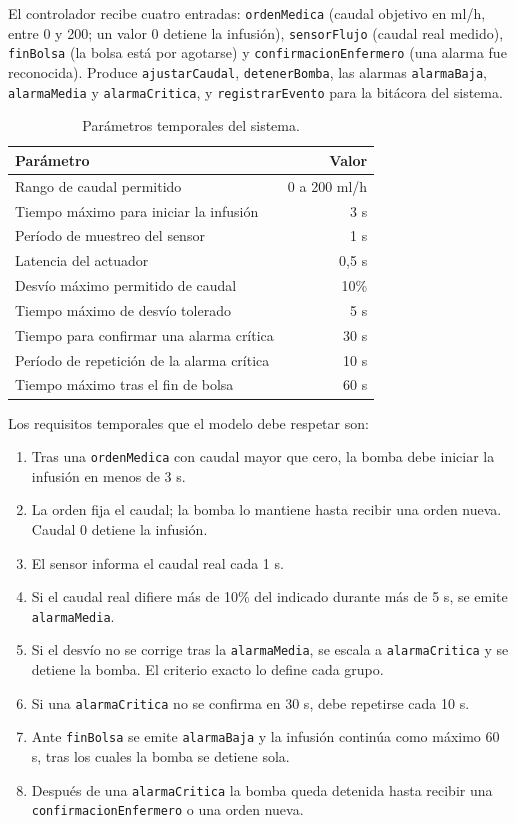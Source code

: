 \documentclass[11pt,a4paper]{article}
\begin{document}
El controlador recibe cuatro entradas: \texttt{ordenMedica} (caudal objetivo en ml/h, entre 0 y 200; un valor 0 detiene la infusión), \texttt{sensorFlujo} (caudal real medido), \texttt{finBolsa} (la bolsa está por agotarse) y \texttt{confirmacionEnfermero} (una alarma fue reconocida). Produce \texttt{ajustarCaudal}, \texttt{detenerBomba}, las alarmas \texttt{alarmaBaja}, \texttt{alarmaMedia} y \texttt{alarmaCritica}, y \texttt{registrarEvento} para la bitácora del sistema.

\begin{table}[h]
\centering
\small
\begin{tabular}{lr}
\toprule
Parámetro & Valor \\
\midrule
Rango de caudal permitido & 0 a 200 ml/h \\
Tiempo máximo para iniciar la infusión & 3 s \\
Período de muestreo del sensor & 1 s \\
Latencia del actuador & 0,5 s \\
Desvío máximo permitido de caudal & 10\% \\
Tiempo máximo de desvío tolerado & 5 s \\
Tiempo para confirmar una alarma crítica & 30 s \\
Período de repetición de la alarma crítica & 10 s \\
Tiempo máximo tras el fin de bolsa & 60 s \\
\bottomrule
\end{tabular}
\caption{Parámetros temporales del sistema.}
\end{table}

Los requisitos temporales que el modelo debe respetar son:

\begin{enumerate}
\item Tras una \texttt{ordenMedica} con caudal mayor que cero, la bomba debe iniciar la infusión en menos de 3 s.
\item La orden fija el caudal; la bomba lo mantiene hasta recibir una orden nueva. Caudal 0 detiene la infusión.
\item El sensor informa el caudal real cada 1 s.
\item Si el caudal real difiere más de 10\% del indicado durante más de 5 s, se emite \texttt{alarmaMedia}.
\item Si el desvío no se corrige tras la \texttt{alarmaMedia}, se escala a \texttt{alarmaCritica} y se detiene la bomba. El criterio exacto lo define cada grupo.
\item Si una \texttt{alarmaCritica} no se confirma en 30 s, debe repetirse cada 10 s.
\item Ante \texttt{finBolsa} se emite \texttt{alarmaBaja} y la infusión continúa como máximo 60 s, tras los cuales la bomba se detiene sola.
\item Después de una \texttt{alarmaCritica} la bomba queda detenida hasta recibir una \texttt{confirmacion\discretionary{}{}{}Enfermero} o una orden nueva.
\end{enumerate}
\end{document}
